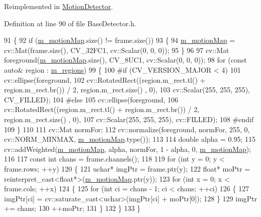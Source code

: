 Reimplemented in \mbox{\hyperlink{class_motion_detector_aa4e606acafdc33a3104471903e449adc}{Motion\+Detector}}.



Definition at line 90 of file Base\+Detector.\+h.


\begin{DoxyCode}
91     \{
92         \textcolor{keywordflow}{if} (\mbox{\hyperlink{class_base_detector_a45a2d54a0b69e271aa5c44ee301682b7}{m\_motionMap}}.size() != frame.size())
93         \{
94             \mbox{\hyperlink{class_base_detector_a45a2d54a0b69e271aa5c44ee301682b7}{m\_motionMap}} = cv::Mat(frame.size(), CV\_32FC1, cv::Scalar(0, 0, 0));
95         \}
96 
97         cv::Mat foreground(\mbox{\hyperlink{class_base_detector_a45a2d54a0b69e271aa5c44ee301682b7}{m\_motionMap}}.size(), CV\_8UC1, cv::Scalar(0, 0, 0));
98         \textcolor{keywordflow}{for} (\textcolor{keyword}{const} \textcolor{keyword}{auto}& region : \mbox{\hyperlink{class_base_detector_a409c20093acba261db8354ca72058fce}{m\_regions}})
99         \{
100 \textcolor{preprocessor}{#if (CV\_VERSION\_MAJOR < 4)}
101             cv::ellipse(foreground,
102                         cv::RotatedRect((region.m\_rect.tl() + region.m\_rect.br()) / 2, region.m\_rect.size()
      , 0),
103                                         cv::Scalar(255, 255, 255), CV\_FILLED);
104 \textcolor{preprocessor}{#else}
105             cv::ellipse(foreground,
106                         cv::RotatedRect((region.m\_rect.tl() + region.m\_rect.br()) / 2, region.m\_rect.size()
      , 0),
107                                         cv::Scalar(255, 255, 255), cv::FILLED);
108 \textcolor{preprocessor}{#endif}
109         \}
110 
111         cv::Mat normFor;
112         cv::normalize(foreground, normFor, 255, 0, cv::NORM\_MINMAX, \mbox{\hyperlink{class_base_detector_a45a2d54a0b69e271aa5c44ee301682b7}{m\_motionMap}}.type());
113 
114         \textcolor{keywordtype}{double} alpha = 0.95;
115         cv::addWeighted(\mbox{\hyperlink{class_base_detector_a45a2d54a0b69e271aa5c44ee301682b7}{m\_motionMap}}, alpha, normFor, 1 - alpha, 0, 
      \mbox{\hyperlink{class_base_detector_a45a2d54a0b69e271aa5c44ee301682b7}{m\_motionMap}});
116 
117         \textcolor{keyword}{const} \textcolor{keywordtype}{int} chans = frame.channels();
118 
119         \textcolor{keywordflow}{for} (\textcolor{keywordtype}{int} y = 0; y < frame.rows; ++y)
120         \{
121             uchar* imgPtr = frame.ptr(y);
122             \textcolor{keywordtype}{float}* moPtr = \textcolor{keyword}{reinterpret\_cast<}\textcolor{keywordtype}{float}*\textcolor{keyword}{>}(\mbox{\hyperlink{class_base_detector_a45a2d54a0b69e271aa5c44ee301682b7}{m\_motionMap}}.ptr(y));
123             \textcolor{keywordflow}{for} (\textcolor{keywordtype}{int} x = 0; x < frame.cols; ++x)
124             \{
125                 \textcolor{keywordflow}{for} (\textcolor{keywordtype}{int} ci = chans - 1; ci < chans; ++ci)
126                 \{
127                     imgPtr[ci] = cv::saturate\_cast<uchar>(imgPtr[ci] + moPtr[0]);
128                 \}
129                 imgPtr += chans;
130                 ++moPtr;
131             \}
132         \}
133     \}
\end{DoxyCode}

